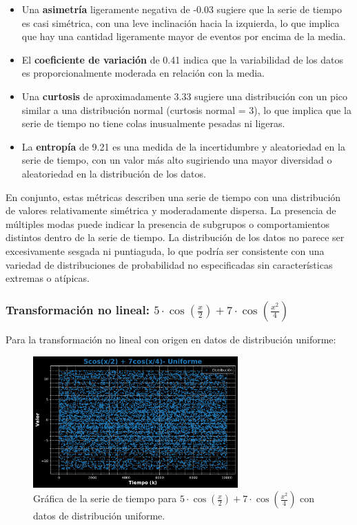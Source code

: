 \documentclass[11pt]{article} %
\begin{document}
\begin{itemize}
		\item Una \textbf{asimetría} ligeramente negativa de -0.03 sugiere que la serie de tiempo es casi simétrica, con una leve inclinación hacia la izquierda, lo que implica que hay una cantidad ligeramente mayor de eventos por encima de la media.
		
		\item El \textbf{coeficiente de variación} de 0.41 indica que la variabilidad de los datos es proporcionalmente moderada en relación con la media.
		
		\item Una \textbf{curtosis} de aproximadamente 3.33 sugiere una distribución con un pico similar a una distribución normal (curtosis normal = 3), lo que implica que la serie de tiempo no tiene colas inusualmente pesadas ni ligeras.
		
		\item La \textbf{entropía} de 9.21 es una medida de la incertidumbre y aleatoriedad en la serie de tiempo, con un valor más alto sugiriendo una mayor diversidad o aleatoriedad en la distribución de los datos.
	\end{itemize}
	
	En conjunto, estas métricas describen una serie de tiempo con una distribución de valores relativamente simétrica y moderadamente dispersa. La presencia de múltiples modas puede indicar la presencia de subgrupos o comportamientos distintos dentro de la serie de tiempo. La distribución de los datos no parece ser excesivamente sesgada ni puntiaguda, lo que podría ser consistente con una variedad de distribuciones de probabilidad no especificadas sin características extremas o atípicas.
	
	\newpage
	\subsubsection{Transformación no lineal: \( 5\cdot \cos\left(\frac{x}{2}\right) + 7\cdot \cos\left(\frac{x^2}{4}\right) \)}
	
	Para la transformación no lineal con origen en datos de distribución uniforme:
	\begin{figure}[h]
		\centering
		\includegraphics[width=0.7\textwidth]{../transformaciones/per_uniforme1.pdf}
		\caption{Gráfica de la serie de tiempo para \( 5\cdot \cos\left(\frac{x}{2}\right) + 7\cdot \cos\left(\frac{x^2}{4}\right) \) con datos de distribución uniforme.}
		\label{fig:perUnifGraf}
	\end{figure}
	
\end{document}
